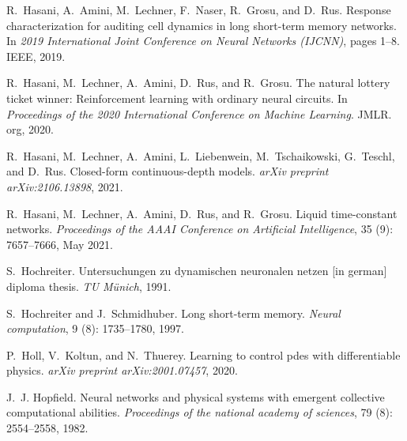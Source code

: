 \documentclass{MITcsail}
\begin{document}
\begin{thebibliography}{96}
R.~Hasani, A.~Amini, M.~Lechner, F.~Naser, R.~Grosu, and D.~Rus.
\newblock Response characterization for auditing cell dynamics in long
  short-term memory networks.
\newblock In \emph{2019 International Joint Conference on Neural Networks
  (IJCNN)}, pages 1--8. IEEE, 2019.

R.~Hasani, M.~Lechner, A.~Amini, D.~Rus, and R.~Grosu.
\newblock The natural lottery ticket winner: Reinforcement learning with
  ordinary neural circuits.
\newblock In \emph{Proceedings of the 2020 International Conference on Machine
  Learning}. JMLR. org, 2020.

R.~Hasani, M.~Lechner, A.~Amini, L.~Liebenwein, M.~Tschaikowski, G.~Teschl, and
  D.~Rus.
\newblock Closed-form continuous-depth models.
\newblock \emph{arXiv preprint arXiv:2106.13898}, 2021{}.

R.~Hasani, M.~Lechner, A.~Amini, D.~Rus, and R.~Grosu.
\newblock Liquid time-constant networks.
\newblock \emph{Proceedings of the AAAI Conference on Artificial Intelligence},
  35 (9): 7657--7666, May 2021{}.

S.~Hochreiter.
\newblock Untersuchungen zu dynamischen neuronalen netzen [in german] diploma
  thesis.
\newblock \emph{TU M{\"u}nich}, 1991.

S.~Hochreiter and J.~Schmidhuber.
\newblock Long short-term memory.
\newblock \emph{Neural computation}, 9 (8): 1735--1780, 1997.

P.~Holl, V.~Koltun, and N.~Thuerey.
\newblock Learning to control pdes with differentiable physics.
\newblock \emph{arXiv preprint arXiv:2001.07457}, 2020.

J.~J. Hopfield.
\newblock Neural networks and physical systems with emergent collective
  computational abilities.
\newblock \emph{Proceedings of the national academy of sciences}, 79
  (8): 2554--2558, 1982.


\end{thebibliography}
\end{document}
